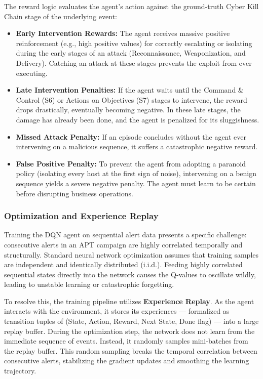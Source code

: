 The reward logic evaluates the agent's action against the ground-truth Cyber Kill Chain stage of the underlying event:
\begin{itemize}
    \item \textbf{Early Intervention Rewards:} The agent receives massive positive reinforcement (e.g., high positive values) for correctly escalating or isolating during the early stages of an attack (Reconnaissance, Weaponization, and Delivery). Catching an attack at these stages prevents the exploit from ever executing.
    \item \textbf{Late Intervention Penalties:} If the agent waits until the Command \& Control (S6) or Actions on Objectives (S7) stages to intervene, the reward drops drastically, eventually becoming negative. In these late stages, the damage has already been done, and the agent is penalized for its sluggishness.
    \item \textbf{Missed Attack Penalty:} If an episode concludes without the agent ever intervening on a malicious sequence, it suffers a catastrophic negative reward.
    \item \textbf{False Positive Penalty:} To prevent the agent from adopting a paranoid policy (isolating every host at the first sign of noise), intervening on a benign sequence yields a severe negative penalty. The agent must learn to be certain before disrupting business operations.
\end{itemize}

\subsubsection{Optimization and Experience Replay}

Training the DQN agent on sequential alert data presents a specific challenge: consecutive alerts in an APT campaign are highly correlated temporally and structurally. Standard neural network optimization assumes that training samples are independent and identically distributed (i.i.d.). Feeding highly correlated sequential states directly into the network causes the Q-values to oscillate wildly, leading to unstable learning or catastrophic forgetting.

To resolve this, the training pipeline utilizes \textbf{Experience Replay}. As the agent interacts with the environment, it stores its experiences --- formalized as transition tuples of (State, Action, Reward, Next State, Done flag) --- into a large replay buffer. During the optimization step, the network does not learn from the immediate sequence of events. Instead, it randomly samples mini-batches from the replay buffer. This random sampling breaks the temporal correlation between consecutive alerts, stabilizing the gradient updates and smoothing the learning trajectory.


